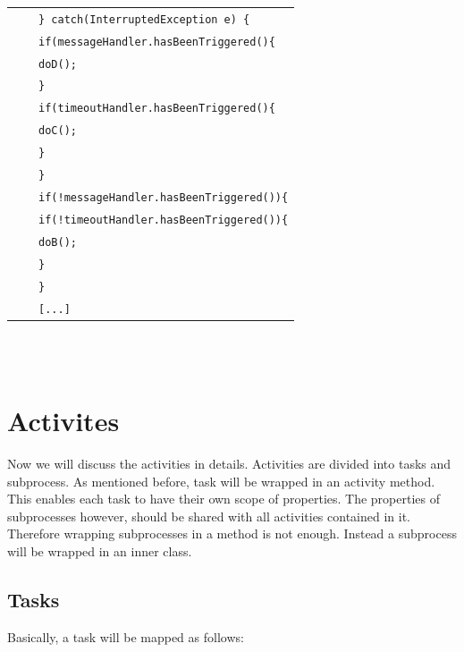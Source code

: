 \begin{tabularx}{\linewidth}{lcX}
	& & \texttt{\} catch(InterruptedException e) \{}\\
	& & \texttt{\hspace{10pt}if(messageHandler.hasBeenTriggered()\{}\\
	& & \texttt{\hspace{20pt}doD();}\\
	& & \texttt{\hspace{10pt}\}}\\
	& & \texttt{\hspace{10pt}if(timeoutHandler.hasBeenTriggered()\{}\\
	& & \texttt{\hspace{20pt}doC();}\\
	& & \texttt{\hspace{10pt}\}}\\
	& & \texttt{\}}\\
	& & \texttt{if(!messageHandler.hasBeenTriggered())\{}\\
	& & \texttt{\hspace{10pt}if(!timeoutHandler.hasBeenTriggered())\{}\\
	& & \texttt{\hspace{20pt}doB();}\\
	& & \texttt{\hspace{10pt}\}}\\
	& & \texttt{\}}\\
	& & \texttt{[...]}\\
\end{tabularx}\\\\

\section{Activites}
Now we will discuss the activities in details. Activities are divided into tasks and subprocess. As mentioned before, task will be wrapped in an activity method. This enables each task to have their own scope of properties. The properties of subprocesses however, should be shared with all activities contained in it. Therefore wrapping subprocesses in a method is not enough. Instead a subprocess will be wrapped in an inner class.
 
\subsection{Tasks}
Basically, a task will be mapped as follows:\\

